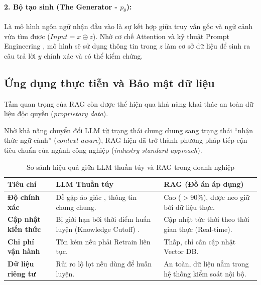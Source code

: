 \paragraph{2. Bộ tạo sinh (The Generator - $p_\theta$):} 
Là mô hình ngôn ngữ nhận đầu vào là sự kết hợp giữa truy vấn gốc và ngữ cảnh vừa tìm được ($Input = x \oplus z$). Nhờ cơ chế Attention và kỹ thuật Prompt Engineering \cite{liu2023pre}, mô hình sẽ sử dụng thông tin trong $z$ làm cơ sở dữ liệu để sinh ra câu trả lời $y$ chính xác và có thể kiểm chứng.

\subsection{Ứng dụng thực tiễn và Bảo mật dữ liệu}
Tầm quan trọng của RAG còn được thể hiện qua khả năng khai thác an toàn dữ liệu độc quyền (\textit{proprietary data}). 

Nhờ khả năng chuyển đổi LLM từ trạng thái chung chung sang trạng thái ``nhận thức ngữ cảnh'' (\textit{context-aware}), RAG hiện đã trở thành phương pháp tiếp cận tiêu chuẩn của ngành công nghiệp (\textit{industry-standard approach}). 

\begin{table}[h]
    \centering
    \caption{So sánh hiệu quả giữa LLM thuần túy và RAG trong doanh nghiệp}
    \label{tab:rag-vs-llm-business}
    \begin{tabular}{|p{4cm}|p{5cm}|p{5cm}|}
        \hline
        \textbf{Tiêu chí} & \textbf{LLM Thuần túy} & \textbf{RAG (Đồ án áp dụng)} \\
        \hline
        \textbf{Độ chính xác} & Dễ gặp ảo giác \cite{ji2023survey}, thông tin chung chung. & Cao ($>90\%$), được neo giữ bởi dữ liệu thực. \\
        \hline
        \textbf{Cập nhật kiến thức} & Bị giới hạn bởi thời điểm huấn luyện (Knowledge Cutoff) \cite{team2024gemini}. & Cập nhật tức thời theo thời gian thực (Real-time). \\
        \hline
        \textbf{Chi phí vận hành} & Tốn kém nếu phải Retrain liên tục. & Thấp, chỉ cần cập nhật Vector DB. \\
        \hline
        \textbf{Dữ liệu riêng tư} & Rủi ro lộ lọt nếu dùng để huấn luyện. & An toàn, dữ liệu nằm trong hệ thống kiểm soát nội bộ. \\
        \hline
    \end{tabular}
\end{table}
